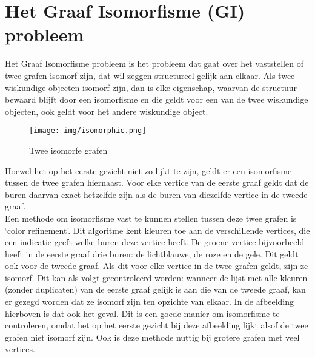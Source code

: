 \documentclass{article}
\begin{document}


\renewcommand*\contentsname{Inhoudsopgave}
\tableofcontents{}
\pagebreak


\section{Het Graaf Isomorfisme (GI) probleem}

Het Graaf Isomorfisme probleem is het probleem dat gaat over het vaststellen of twee grafen isomorf zijn, dat wil zeggen structureel gelijk aan elkaar. Als twee wiskundige objecten isomorf zijn, dan is elke eigenschap, waarvan de structuur bewaard blijft door een isomorfisme en die geldt voor een van de twee wiskundige objecten, ook geldt voor het andere wiskundige object.\\

\begin{wrapfigure}{r}{0.5\textwidth}
\begin{center}
\texttt{[image: img/isomorphic.png]}
\end{center}
\caption{Twee isomorfe grafen}
\end{wrapfigure}

Hoewel het op het eerste gezicht niet zo lijkt te zijn, geldt er een isomorfisme tussen de twee grafen hiernaast. Voor elke vertice van de eerste graaf geldt dat de buren daarvan exact hetzelfde zijn als de buren van diezelfde vertice in de tweede graaf.\\

Een methode om isomorfisme vast te kunnen stellen tussen deze twee grafen is ‘color refinement’. Dit algoritme kent kleuren toe aan de verschillende vertices, die een indicatie geeft welke buren deze vertice heeft. De groene vertice bijvoorbeeld heeft in de eerste graaf drie buren: de lichtblauwe, de roze en de gele. Dit geldt ook voor de tweede graaf. Als dit voor elke vertice in de twee grafen geldt, zijn ze isomorf. Dit kan als volgt gecontroleerd worden: wanneer de lijst met alle kleuren (zonder duplicaten) van de eerste graaf gelijk is aan die van de tweede graaf, kan er gezegd worden dat ze isomorf zijn ten opzichte van elkaar. In de afbeelding hierboven is dat ook het geval.
Dit is een goede manier om isomorfisme te controleren, omdat het op het eerste gezicht bij deze afbeelding lijkt alsof de twee grafen niet isomorf zijn. Ook is deze methode nuttig bij grotere grafen met veel vertices.
\end{document}
